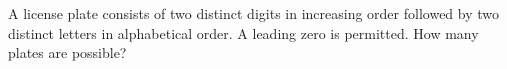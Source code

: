 A license plate consists of two distinct digits in increasing order followed by two distinct letters in alphabetical order. A leading zero is permitted. How many plates are possible?
